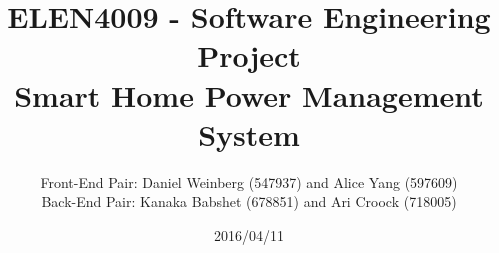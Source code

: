 \documentclass[11pt, a4paper]{article}
\title{ELEN4009 - Software Engineering Project \\ Smart Home Power Management System}
\author{Front-End Pair: Daniel Weinberg (547937) and Alice Yang (597609)\\ Back-End Pair: Kanaka Babshet (678851) and Ari Croock (718005)}
\date{2016/04/11}
\begin{document}
	
	\begin{titlepage}
		\maketitle	
	\end{titlepage}
	
\end{document}
